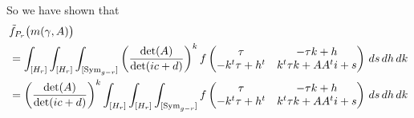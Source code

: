 So we have shown that 
\begin{align*}
	&\tilde f_{P_r}\bigl(m(\gamma, A)\bigr) \\
	 &= \int^{}_{[H_r]}\int^{}_{[H_r]}\int^{}_{[\mathrm{Sym}_{g-r}]}  \left(\frac{\det(A)}{\det(ic + d)}\right)^{k} f\begin{pmatrix} \tau & -\tau k + h\\ -k^t \tau + h^t & k^t \tau k + A A^t i + s \end{pmatrix}   \,ds\,dh\,dk\\
	&= \left(\frac{\det(A)}{\det(ic + d)}\right)^{k} \int^{}_{[H_r]}\int^{}_{[H_r]}\int^{}_{[\mathrm{Sym}_{g-r}]}  f\begin{pmatrix} \tau & -\tau k + h\\ -k^t \tau + h^t & k^t \tau k + A A^t i + s \end{pmatrix}   \,ds\,dh\,dk\\
\end{align*}

